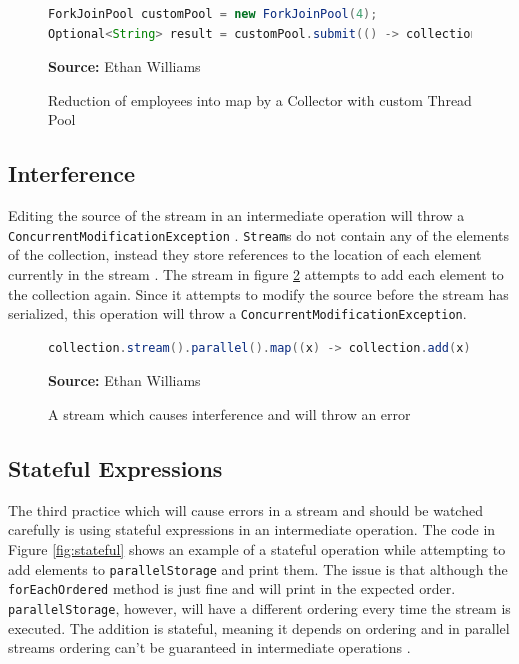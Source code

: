 \documentclass[oneside, 12pt]{article}
\newcommand{\source}[1]{\textbf{Source:} {#1} }
\begin{document}
\begin{figure}[H]
\centering
\begin{lstlisting}[language=Java]
ForkJoinPool customPool = new ForkJoinPool(4);
Optional<String> result = customPool.submit(() -> collection.stream().parallel().map((arg) -> longOperation(arg).findAny()).get();
\end{lstlisting}
\caption{Reduction of employees into map by a Collector with custom Thread Pool}
\source{Ethan Williams}
\label{fig:custom_pool}
\end{figure}

\subsection{Interference}
Editing the source of the stream in an intermediate operation will throw a \verb|ConcurrentModificationException| \autocite{parallelism_doc}. \verb|Stream|s do not contain any of the elements of the collection, instead they store references to the location of each element currently in the stream \autocite{ibm_uh_3}.  The stream in figure \ref{fig:interference} attempts to add each element to the collection again. Since it attempts to modify the source before the stream has serialized, this operation will throw a \verb|ConcurrentModificationException|.

\begin{figure}[H]
\centering
\begin{lstlisting}[language=Java]
collection.stream().parallel().map((x) -> collection.add(x)).toArray();
\end{lstlisting}
\caption{A stream which causes interference and will throw an error}
\source{Ethan Williams}
\label{fig:interference}
\end{figure}

\subsection{Stateful Expressions} \label{stateful_expressions}
The third practice which will cause errors in a stream and should be watched carefully is using stateful expressions in an intermediate operation. The code in Figure \ref{fig:stateful} shows an example of a stateful operation while attempting to add elements to \verb|parallelStorage| and print them. The issue is that although the \verb|forEachOrdered| method is just fine and will print in the expected order. \verb|parallelStorage|, however, will have a different ordering every time the stream is executed. The addition is stateful, meaning it depends on ordering and in parallel streams ordering can't be guaranteed in intermediate operations \autocite{parallelism_doc}.
\end{document}
